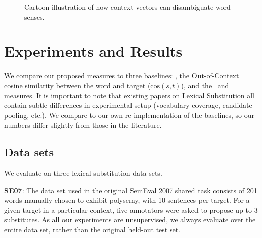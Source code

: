 \begin{figure}
\centering
{}
\caption{Cartoon illustration of how context vectors can disambiguate word senses.}
\label{fig:substitution}
\end{figure}


\section{Experiments and Results}
We compare our proposed measures to three baselines: \ooc, the Out-of-Context
cosine similarity between the word and target ($\mbox{cos}(s, t)$), and the \addCos~and \balAddCos~
measures. It is important to note that existing papers on Lexical Substitution all contain subtle
differences in experimental setup (vocabulary coverage, candidate pooling,
etc.). We compare to our own re-implementation of the baselines, so our
numbers differ slightly from those in the literature.

\subsection{Data sets}

We evaluate on three lexical substitution data sets.

{\bf SE07}: The data set used in the original SemEval 2007 shared task \cite{mccarthy:2007:semeval}
consists of 201 words manually chosen to exhibit polysemy, with 10 sentences
per target. For a given target in a particular context, five annotators were asked to propose up
to 3 substitutes. As all our experiments are
unsupervised, we always evaluate over the entire data set, rather than the
original held-out test set.

